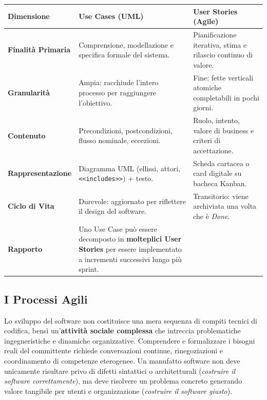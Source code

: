 \documentclass[12pt]{extarticle}
\begin{document}
\begin{center}
\small
\begin{tabular}{p{3.2cm}p{5.5cm}p{5.5cm}}
    \toprule
    \textbf{Dimensione} & \textbf{Use Cases (UML)} & \textbf{User Stories (Agile)} \\
    \midrule
    \textbf{Finalità Primaria} & Comprensione, modellazione e specifica formale del sistema. & Pianificazione iterativa, stima e rilascio continuo di valore. \\
    \addlinespace
    \textbf{Granularità} & Ampia: racchiude l'intero processo per raggiungere l'obiettivo. & Fine: fette verticali atomiche completabili in pochi giorni. \\
    \addlinespace
    \textbf{Contenuto} & Precondizioni, postcondizioni, flusso nominale, eccezioni. & Ruolo, intento, valore di business e criteri di accettazione. \\
    \addlinespace
    \textbf{Rappresentazione} & Diagramma UML (ellissi, attori, \texttt{<<includes>>}) + testo. & Scheda cartacea o card digitale su bacheca Kanban. \\
    \addlinespace
    \textbf{Ciclo di Vita} & Durevole: aggiornato per riflettere il design del software. & Transitorio: viene archiviata una volta che è \textit{Done}. \\
    \addlinespace
    \textbf{Rapporto} & Uno Use Case può essere decomposto in \textbf{molteplici User Stories} per essere implementato a incrementi successivi lungo più sprint. \\
    \bottomrule
\end{tabular}
\end{center}

\subsection{I Processi Agili}\label{sec:processi-agili}

\noindent Lo sviluppo del software non costituisce una mera sequenza di compiti tecnici di codifica, bensì un'\textbf{attività sociale complessa} che intreccia problematiche ingegneristiche e dinamiche organizzative. Comprendere e formalizzare i bisogni reali del committente richiede conversazioni continue, rinegoziazioni e coordinamento di competenze eterogenee. Un manufatto software non deve unicamente risultare privo di difetti sintattici o architetturali (\textit{costruire il software correttamente}), ma deve risolvere un problema concreto generando valore tangibile per utenti e organizzazione (\textit{costruire il software giusto}).
\end{document}
